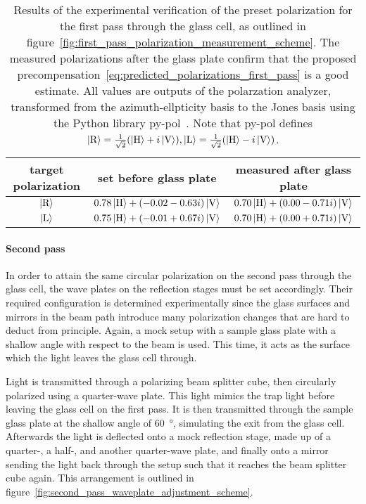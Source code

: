 \begin{table}
    \centering

    \begin{tabular}{ccc}
        \toprule
        target polarization & set before glass plate & measured after glass plate \\
        \midrule
        $\Ket{\text{R}}$ & $0.78 \Ket{\text{H}} + (-0.02-0.63i) \Ket{\text{V}}$ & $0.70 \Ket{\text{H}} +(0.00-0.71i)\Ket{\text{V}}$ \\
        $\Ket{\text{L}}$ & $0.75 \Ket{\text{H}} + (-0.01+0.67i)\Ket{\text{V}}$ & $0.70 \Ket{\text{H}} + (0.00+0.71i)\Ket{\text{V}}$ \\
        \bottomrule
    \end{tabular}
    \caption{Results of the experimental verification of the preset polarization for the first pass through the glass cell, as outlined in figure~\ref{fig:first_pass_polarization_measurement_scheme}. The measured polarizations after the glass plate confirm that the proposed precompensation~\eqref{eq:predicted_polarizations_first_pass} is a good estimate. All values are outputs of the polarzation analyzer, transformed from the azimuth-ellpticity basis to the Jones basis using the Python library py-pol~\cite{noauthor_python_nodate}. Note that py-pol defines $\Ket{\text{R}} = \frac{1}{\sqrt{2}}(\Ket{\text{H}}+i\Ket{\text{V}}), \Ket{\text{L}} = \frac{1}{\sqrt{2}}(\Ket{\text{H}}-i\Ket{\text{V}})$.}
        \label{tab:polarization_first_pass}
\end{table}

\paragraph{Second pass}
In order to attain the same circular polarization on the second pass through the glass cell, the wave plates on the reflection stages must be set accordingly. Their required configuration is determined experimentally since the glass surfaces and mirrors in the beam path introduce many polarization changes that are hard to deduct from principle. Again, a mock setup with a sample glass plate with a shallow angle with respect to the beam is used. This time, it acts as the surface which the light leaves the glass cell through.

Light is transmitted through a polarizing beam splitter cube, then circularly polarized using a quarter-wave plate. This light mimics the trap light before leaving the glass cell on the first pass. It is then transmitted through the sample glass plate at the shallow angle of \SI{60}{\degree}, simulating the exit from the glass cell. Afterwards the light is deflected onto a mock reflection stage, made up of a quarter-, a half-, and another quarter-wave plate, and finally onto a mirror sending the light back through the setup such that it reaches the beam splitter cube again. This arrangement is outlined in figure~\ref{fig:second_pass_waveplate_adjustment_scheme}.

